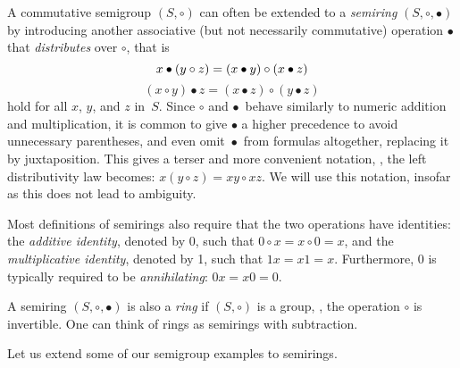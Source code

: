 \documentclass{toc}
\begin{document}
A commutative semigroup $(S, \circ)$ can often be extended to a \emph{semiring}
$(S, \circ, \bullet)$ by introducing another associative (but not necessarily
commutative) operation $\bullet$ that \emph{distributes} over $\circ$, that is
\[
x \bullet (y \circ z) = (x \bullet y) \circ (x \bullet z)\\
\]
\[
(x \circ y) \bullet z = (x \bullet z) \circ (y \bullet z)
\]
hold for all $x$, $y$, and $z$ in~$S$. Since $\circ$ and $\bullet$~behave
similarly to numeric addition and multiplication, it is common to give $\bullet$
a higher precedence to avoid unnecessary parentheses, and even omit~$\bullet$~from
formulas altogether, replacing it by juxtaposition. This gives a terser and
more convenient notation, \eg, the left distributivity law becomes:
$x (y \circ z) = x y \circ x z$. We will use this notation, insofar as this does
not lead to ambiguity.  

Most definitions of semirings also require that the two operations have
identities: the \emph{additive identity}, denoted by 0, such that
$0 \circ x = x \circ 0=x$, and the \emph{multiplicative identity}, denoted by 1,
such that $1x=x1=x$. Furthermore, 0 is typically required to be
\emph{annihilating}: $0x=x0=0$.

A semiring $(S, \circ, \bullet)$ is also a \emph{ring} if $(S, \circ)$ is a
group, \ie, the operation $\circ$ is invertible. One can think of rings as
semirings with subtraction.

Let us extend some of our semigroup examples to
semirings. %
\end{document}
